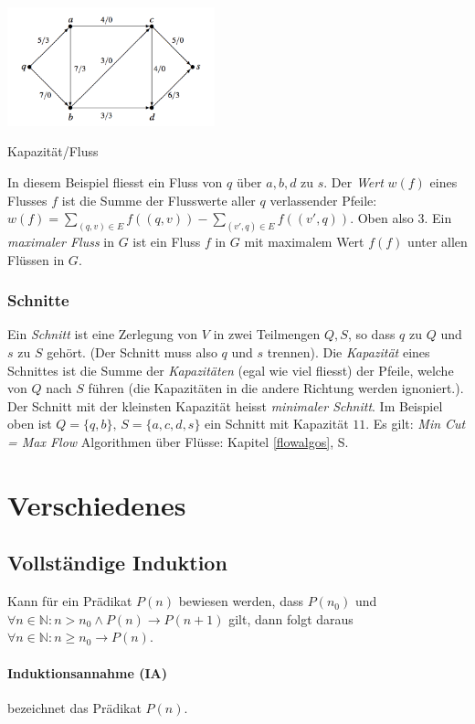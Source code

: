 \documentclass[a4paper, 9pt, DIV=20]{scrartcl}
\newcommand{\N}{\mathbb{N}}
\begin{document}
\begin{center}
\includegraphics[width=6cm]{FlowExample}

Kapazität/Fluss
\end{center}

In diesem Beispiel fliesst ein Fluss von $q$ über $a,b,d$ zu $s$. Der \emph{Wert} $w(f)$ eines Flusses $f$ ist die Summe der Flusswerte aller $q$ verlassender Pfeile: $w(f) = \sum_{(q,v)\in E}{f((q,v))}-\sum_{(v',q)\in E}{f((v',q))}$. Oben also 3. Ein \emph{maximaler Fluss} in $G$ ist ein Fluss $f$ in $G$ mit maximalem Wert $f(f)$ unter allen Flüssen in $G$.
\subsubsection{Schnitte}
Ein \emph{Schnitt} ist eine Zerlegung von $V$ in zwei Teilmengen $Q,S$, so dass $q$ zu $Q$ und $s$ zu $S$ gehört. (Der Schnitt muss also $q$ und $s$ trennen). Die \emph{Kapazität} eines Schnittes ist die Summe der \emph{Kapazitäten} (egal wie viel fliesst) der Pfeile, welche von $Q$ nach $S$ führen (die Kapazitäten in die andere Richtung werden ignoniert.). Der Schnitt mit der kleinsten Kapazität heisst \emph{minimaler Schnitt}. Im Beispiel oben ist $Q = \{q,b\},\, S = \{a,c,d,s\}$ ein Schnitt mit Kapazität $11$. Es gilt: \emph{Min Cut = Max Flow}
Algorithmen über Flüsse: Kapitel \ref{flowalgos}, S. \pageref{flowalgos}

\section{Verschiedenes}

\subsection{Vollständige Induktion}
Kann für ein Prädikat $P(n)$ bewiesen werden, dass $P(n_0)$ und $\forall n\in\N: n > n_0 \wedge P(n) \to P(n+1)$ gilt,
dann folgt daraus $\forall n\in\N: n \geq n_0 \rightarrow P(n)$.

\paragraph{Induktionsannahme (IA)} bezeichnet das Prädikat $P(n)$.
\end{document}
